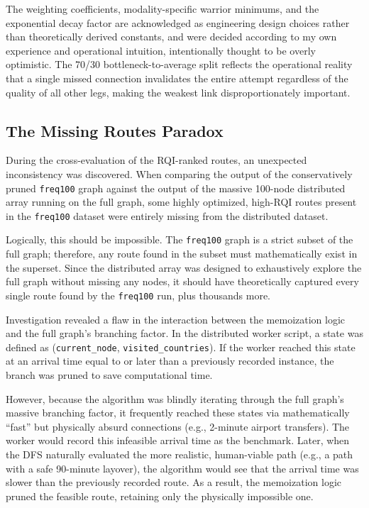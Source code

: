 \medskip

The weighting coefficients, modality-specific warrior minimums, and the exponential decay factor are acknowledged as engineering design choices rather than theoretically derived constants, and were decided according to my own experience and operational intuition, intentionally thought to be overly optimistic. The 70/30 bottleneck-to-average split reflects the operational reality that a single missed connection invalidates the entire attempt regardless of the quality of all other legs, making the weakest link disproportionately important.

\subsection{The Missing Routes Paradox}
\label{subsec:missing_routes_paradox}

During the cross-evaluation of the RQI-ranked routes, an unexpected inconsistency was discovered. When comparing the output of the conservatively pruned \texttt{freq100} graph against the output of the massive 100-node distributed array running on the full graph, some highly optimized, high-RQI routes present in the \texttt{freq100} dataset were entirely missing from the distributed dataset.

\medskip

Logically, this should be impossible. The \texttt{freq100} graph is a strict subset of the full graph; therefore, any route found in the subset must mathematically exist in the superset. Since the distributed array was designed to exhaustively explore the full graph without missing any nodes, it should have theoretically captured every single route found by the \texttt{freq100} run, plus thousands more.

\medskip

Investigation revealed a flaw in the interaction between the memoization logic and the full graph's branching factor. In the distributed worker script, a state was defined as (\texttt{current\_node}, \texttt{visited\_countries}). If the worker reached this state at an arrival time equal to or later than a previously recorded instance, the branch was pruned to save computational time.

\medskip

However, because the algorithm was blindly iterating through the full graph's massive branching factor, it frequently reached these states via mathematically ``fast'' but physically absurd connections (e.g., 2-minute airport transfers). The worker would record this infeasible arrival time as the benchmark. Later, when the DFS naturally evaluated the more realistic, human-viable path (e.g., a path with a safe 90-minute layover), the algorithm would see that the arrival time was slower than the previously recorded route. As a result, the memoization logic pruned the feasible route, retaining only the physically impossible one.

